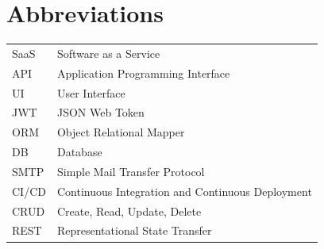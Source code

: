 \documentclass[12pt,a4paper]{report}
\begin{document}
\newpage
\section*{Abbreviations}

\begin{tabular}{ll}
SaaS & Software as a Service \\
API  & Application Programming Interface \\
UI   & User Interface \\
JWT  & JSON Web Token \\
ORM  & Object Relational Mapper \\
DB   & Database \\
SMTP & Simple Mail Transfer Protocol \\
CI/CD & Continuous Integration and Continuous Deployment \\
CRUD & Create, Read, Update, Delete \\
REST & Representational State Transfer \\
\end{tabular}

\newpage
\thispagestyle{empty}
\fancyhead{}
\renewcommand{\headrulewidth}{0pt}

\tableofcontents

\newpage
\pagestyle{fancy}
\renewcommand{\headrulewidth}{0.5pt}
\renewcommand{\footrulewidth}{0.5pt}
\end{document}
